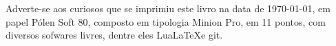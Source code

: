 \blankpage
\pagebreak
\ifodd\thepage\blankpage\fi

\parindent=0pt
\footnotesize\thispagestyle{empty}

\newfontfamily{}

\mbox{}\vfill
\begin{center}
		\begin{minipage}{.7\textwidth}\tiny\noindent{}
		\centering\tiny\minion
		Adverte-se aos curiosos que se imprimiu este livro 
		na data de \today, em papel Pólen Soft 80, composto em tipologia Minion Pro, em 11 pontos, 
		com diversos sofwares livres, 
		dentre eles Lua\LaTeX e git.\\ 
		\medskip\\\
		\end{minipage}
\end{center}